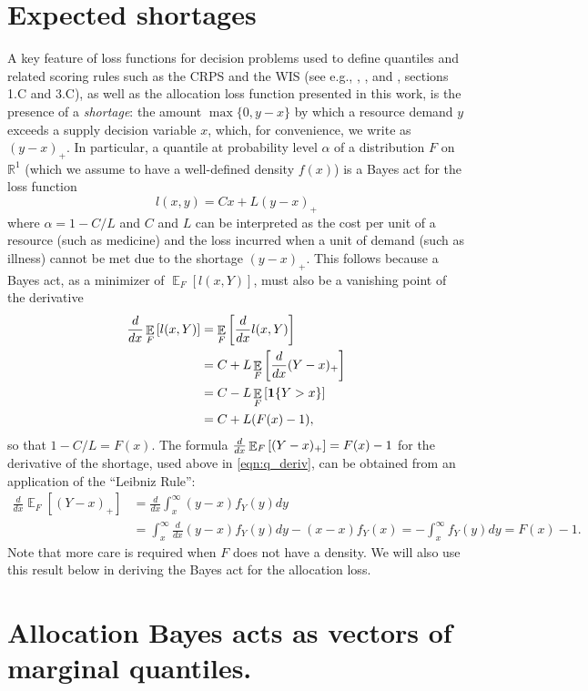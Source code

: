 \documentclass{article}\usepackage[]{graphicx}\usepackage[]{xcolor}
\DeclareMathOperator{\Ex}{\mathbb{E}}
\begin{document}
\section{Expected shortages}
\label{sec:ex-shortage}

A key feature of loss functions for decision problems used to define quantiles and related scoring rules such as the
CRPS and the WIS (see e.g., \cite{gneiting2011quantiles}, \cite{jose2009evaluating}, and \cite{royset2022optimization},
sections 1.C and 3.C), as well as the allocation loss function presented in this work, is the presence of a
\emph{shortage}: the amount $\max\{0,y-x\}$ by which a resource demand $y$ exceeds a supply decision variable $x$,
which, for convenience, we write as $(y-x)_{+}$. In particular, a quantile at probability level $\alpha$ of a
distribution $F$ on $\mathbb{R}^1$ (which we assume to have a well-defined density $f(x)$) is a Bayes act for the loss
function
\[
l(x,y) = Cx + L(y-x)_{+}
\]
where $\alpha = 1-C/L$ and $C$ and $L$ can be interpreted as the cost per unit of a resource (such as medicine) and the
loss incurred when a unit of demand (such as illness) cannot be met due to the shortage $(y-x)_{+}$.  This follows
because a Bayes act, as a minimizer of $\Ex_F[l(x,Y)]$, must also be a vanishing point of the derivative
\begin{align}
\dby{}{x} \Ex_F\left[l(x,Y)\right] &= \Ex_F\left[\dby{}{x}l(x,Y)\right] \nonumber\\
&= C + L\Ex_F\left[\dby{}{x}(Y-x)_+\right] \nonumber\\
&= C - L\Ex_F\left[\mathbf{1}\{Y > x\}\right] \nonumber\\
&= C + L(F(x) - 1), \label{eqn:q_deriv}
\end{align}
so that $1-C/L = F(x)$.
The formula $\dby{}{x}\Ex_F\left[(Y-x)_+\right] = F(x) - 1$ for the derivative of the shortage, used above in
\eqref{eqn:q_deriv}, can be obtained from an application of the ``Leibniz Rule'':
\begin{align}
	\frac{d}{dx} \Ex_F [(Y-x)_{+}] &= \frac{d}{dx} \int_{x}^{\infty} (y-x) f_Y(y)dy \nonumber\\
	&= \int_{x}^{\infty} \frac{d}{dx}(y-x) f_Y(y)dy - (x-x) f_Y(x) = -\int_{x}^{\infty} f_Y(y)dy = F(x)-1. \label{eqn:shortage_deriv}
\end{align}
Note that more care is required when $F$ does not have a density.
We will also use this result below in deriving the Bayes act for the allocation loss.

\section{Allocation Bayes acts as vectors of marginal quantiles.}
\label{sec:bayes-quantiles}
\end{document}
